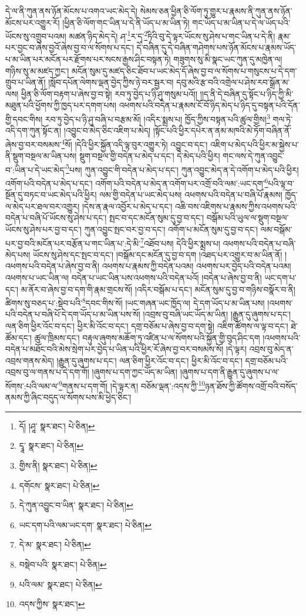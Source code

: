 དེ་ལ་ནི་ཀུན་ནས་ཉོན་མོངས་པ་འགའ་ཡང་མེད་དེ། སེམས་ཅན་ཕྱིན་ཅི་ལོག་ཏུ་གྱུར་པ་རྣམས་ནི་ཀུན་ནས་ཉོན་མོངས་པར་འགྱུར་རོ། །ཕྱིན་ཅི་ལོག་གང་ཡིན་པ་དེ་ནི་ཡོད་པ་མ་ཡིན་ཏེ། གང་ཡོད་པ་མ་ཡིན་པ་དེ་ལ་ཡོད་པའི་ཡོངས་སུ་འགྲུབ་པའམ། མཚན་ཉིད་མེད་དེ། ཤ་\footnote{དོ། །ཤཱ་  སྣར་ཐང་།  པེ་ཅིན། }ར་དྭ་\footnote{དྭཱ་  སྣར་ཐང་།  པེ་ཅིན། }ཏིའི་བུ་དེ་ལྟར་ཡོངས་སུ་ཤེས་པ་གང་ཡིན་པ་དེ་ནི། རྣམ་པར་བྱང་བ་ཞེས་བྱའོ་ཞེས་བྱ་བ་ལ་སོགས་པ་དང་། དེ་བཞིན་དུ་དེ་བཞིན་གཤེགས་པས་ཉོན་མོངས་པ་རྣམས་ཡོད་པ་མ་ཡིན་པར་མངོན་པར་རྫོགས་པར་སངས་རྒྱས་ཤིང་བསྟན་ཏེ། གཟུགས་སུ་མི་སྣང་ཡང་ཀུན་དུ་མཁྱེན་ལ། གཉིས་སུ་མ་མཛད་ཀྱང་། མངོན་སུམ་དུ་མཛད་ཅིང་ཐོབ་པ་ཡང་མེད་དོ་ཞེས་བྱ་བ་ལ་སོགས་པ་གསུངས་པ་དེ་དག་གྲུབ་པ་ཡིན་ནོ། །སློབ་དཔོན་ལེགས་ལྡན་བྱེད་ཀྱིས་ཉེ་བར་སྦྱར་བ། དབུ་མའི་རྩ་བའི་འགྲེལ་པ་ཤེས་རབ་སྒྲོན་མ་ལས། ཕྱིན་ཅི་ལོག་བརྟག་པ་ཞེས་བྱ་བ་སྟེ། རབ་ཏུ་བྱེད་པ་ཉི་ཤུ་གསུམ་པའོ།། །།ད་ནི་དེ་བཞིན་དུ་སྟོང་པ་ཉིད་ཀྱི་མི་མཐུན་པའི་ཕྱོགས་ཀྱི་ཁྱད་པར་དགག་པས། འཕགས་པའི་བདེན་པ་རྣམས་ངོ་བོ་ཉིད་མེད་པ་ཉིད་དུ་བསྟན་པའི་དོན་གྱི་དབང་གིས། རབ་ཏུ་བྱེད་པ་ཉི་ཤུ་བཞི་པ་བརྩམ་མོ། །འདིར་སྨྲས་པ། ཁྱོད་ཀྱིས་བསྟན་པའི་ཚུལ་གྱིས།\footnote{གྱིས་ནི།  སྣར་ཐང་།  པེ་ཅིན། } གལ་ཏེ་འདི་དག་ཀུན་སྟོང་ན། །འབྱུང་བ་མེད་ཅིང་འཇིག་པ་མེད། །སྟོང་པའི་ཕྱིར་དཔེར་ན་ནམ་མཁའི་མེ་ཏོག་བཞིན་ནོ་ཞེས་བྱ་བར་བསམས་\footnote{དགོངས་  སྣར་ཐང་།  པེ་ཅིན། }སོ། །དེའི་ཕྱིར་སྐྱོན་འདི་ལྟ་བུར་འགྱུར་ཏེ། འབྱུང་བ་དང་། འཇིག་པ་མེད་པའི་ཕྱིར་མ་སྐྱེས་པ་ནི་སྡུག་བསྔལ་མ་ཡིན་པས། སྡུག་བསྔལ་གྱི་བདེན་པ་མེད་པ་དང་། དེ་མེད་པའི་ཕྱིར། གང་ལས་དེ་ཀུན་འབྱུང་བ་:ཡིན་པ་དེ་ཡང་མེད་\footnote{དེ་ཀུན་འབྱུང་བ་ཡིན་  སྣར་ཐང་།  པེ་ཅིན། }པས། ཀུན་འབྱུང་གི་བདེན་པ་མེད་པ་དང་། ཀུན་འབྱུང་མེད་ན་དེ་འགོག་པ་མེད་པའི་ཕྱིར། འགོག་པའི་བདེན་པ་མེད་པ་དང་། འགོག་པའི་བདེན་པ་མེད་ན་འགོག་པར་འགྲོ་བའི་ལམ་:ཡང་དག་\footnote{ཡང་དག་པའི་ལམ་ཡང་དག་  སྣར་ཐང་།  པེ་ཅིན། }པའི་ལྟ་བ་སྔོན་དུ་བཏང་བ་ཡང་མེད་པའི་ཕྱིར། ལམ་གྱི་བདེན་པ་ཡང་མེད་པས། འཕགས་པའི་བདེན་པ་བཞི་པོ་རྣམས། ཁྱོད་ལ་མེད་པར་ཐལ་བར་འགྱུར། །དེས་ན་རྣལ་འབྱོར་པ་མེད་པ་དང་། འཆི་བས་འཇིགས་པ་རྣམས་ཀྱིས་འཕགས་པའི་བདེན་པ་བཞི་པོ་ཡོངས་སུ་ཤེས་པ་དང་། སྤང་བ་དང་མངོན་སུམ་དུ་བྱ་བ་དང་། བསྒོམ་པའི་ཡུལ་ལ་སྡུག་བསྔལ་ཡོངས་སུ་ཤེས་པར་བྱ་བ་དང་། ཀུན་འབྱུང་སྤང་བར་བྱ་བ་དང་། འགོག་པ་མངོན་སུམ་དུ་བྱ་བ་དང་། ལམ་བསྒོམ་པར་བྱ་བའི་མངོན་པར་བརྩོན་པ་གང་ཡིན་པ་:དེ་མི་\footnote{དེ་མ་  སྣར་ཐང་།  པེ་ཅིན། }འཐོབ་པས། དེའི་ཕྱིར་སྨྲས་པ། འཕགས་པའི་བདེན་པ་བཞི་མེད་པས། ཡོངས་སུ་ཤེས་དང་སྤང་བ་དང་། །བསྒོམ་དང་མངོན་དུ་བྱ་བ་དག །འཐད་པར་འགྱུར་བ་མ་ཡིན་ནོ། །འཕགས་པའི་བདེན་པ་ཞེས་བྱ་བ་ནི། འཕགས་པ་རྣམས་ཀྱི་བདེན་པའམ། འཕགས་པར་བྱེད་པའི་བདེན་པའམ། འཕགས་པ་ཡང་ཡིན་ལ། བདེན་པ་ཡང་ཡིན་པས་འཕགས་པའི་བདེན་པའོ། །བདེན་པ་ཞེས་བྱ་བ་ནི། ཡང་དག་པ་དང་། མ་ནོར་བ་ཞེས་བྱ་བ་དག་གི་རྣམ་གྲངས་སོ། །འདིར་བསྒོམ་པ་དང་། མངོན་སུམ་དུ་བྱ་བ་གཉིས་བསྣོར་བ་ནི། ཚིགས་སུ་བཅད་པ་:སྡེབ་པའི་\footnote{བསྡེབ་པའི་  སྣར་ཐང་།  པེ་ཅིན། }དབང་གིས་སོ། །ཡང་གཞན་ཡང་ཁྱོད་ལ། དེ་དག་ཡོད་པ་མ་ཡིན་པས། །འཕགས་པའི་བདེན་པ་བཞི་པོ་དེ་དག་ཡོད་པ་མ་ཡིན་པས་སོ། །འབྲས་བུ་བཞི་ཡང་ཡོད་མ་ཡིན། །རྒྱུན་དུ་ཞུགས་པ་དང་། ལན་ཅིག་ཕྱིར་འོང་བ་དང་། ཕྱིར་མི་འོང་བ་དང་། དགྲ་བཅོམ་པ་ཞེས་བྱ་བ་དག་སྟེ། འཇིག་ཚོགས་ལ་ལྟ་བ་དང་། ཐེ་ཚོམ་དང་། ཚུལ་ཁྲིམས་དང་། བརྟུལ་ཞུགས་མཆོག་ཏུ་འཛིན་པ་ལ་སོགས་པའི་སྐྱོན་གྱི་བུད་ཤིང་དག །འཕགས་པའི་བདེན་པ་མཐོང་བའི་མེས་སྲེག་པར་བྱེད་པ་ཡིན་པའི་ཕྱིར་རོ་ཞེས་བྱ་བར་བསམས་སོ། །དེ་ལྟར། འབྲས་བུ་མེད་ན་འབྲས་གནས་མེད། །རྒྱུན་དུ་ཞུགས་པ་དང་། ལན་ཅིག་ཕྱིར་འོང་བ་དང་། ཕྱིར་མི་འོང་བ་དང་། དགྲ་བཅོམ་པའི་འབྲས་བུ་ལ་གནས་པ་དེ་དག་གོ། །ཞུགས་པ་དག་ཀྱང་ཡོད་མ་ཡིན། །ཞུགས་པ་དག་ནི་རྒྱུན་དུ་ཞུགས་པ་ལ་སོགས་:པའི་ལམ་ལ་\footnote{པའི་ལམ་  སྣར་ཐང་།  པེ་ཅིན། }གནས་པ་དག་གོ། །དེ་ལྟར་ན། བཅོམ་ལྡན་:འདས་ཀྱི་\footnote{འདས་ཀྱིས་  སྣར་ཐང་། }ཉན་ཐོས་ཀྱི་ཚོགས་འགྲོ་བའི་བསོད་ནམས་ཀྱི་ཞིང་བདུད་ལ་སོགས་པས་མི་ཕྱེད་ཅིང་། 